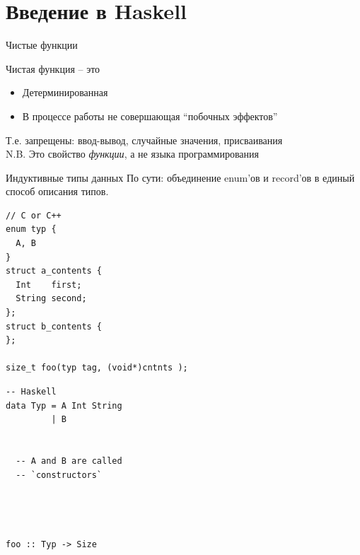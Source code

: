 \documentclass[aspectratio=169
  , xcolor={svgnames}
  , hyperref={ colorlinks,citecolor=DeepPink4
             , linkcolor=DarkRed,urlcolor=DarkBlue}
  , russian
  ]{beamer}
\theoremstyle{exerciseStyle1}
\begin{document}
\section{Введение в Haskell}

\begin{frame}[fragile]{Чистые функции}
\begin{definition}{Чистая функция -- это}
  \begin{itemize}
    \item Детерминированная
    \item В процессе работы не совершающая ``побочных эффектов''
  \end{itemize}
\end{definition}
Т.е. запрещены: ввод-вывод, случайные значения, присваивания\\

N.B. Это свойство \emph{функции}, а не языка программирования

\end{frame}


\begin{frame}[fragile]{Индуктивные типы данных}
По сути: объединение enum'ов и  record'ов в единый способ описания типов.\\

\begin{minipage}{.58\textwidth}
\begin{verbatim}
// C or C++
enum typ {
  A, B
}
struct a_contents {
  Int    first;
  String second;
};
struct b_contents {
};

size_t foo(typ tag, (void*)cntnts );
\end{verbatim}
\end{minipage}
\begin{minipage}{.38\textwidth}
\begin{verbatim}
-- Haskell
data Typ = A Int String
         | B
         
         
  -- A and B are called 
  -- `constructors` 
         
         
         
         
foo :: Typ -> Size         
\end{verbatim}
\end{minipage}
\end{frame}
\end{document}
